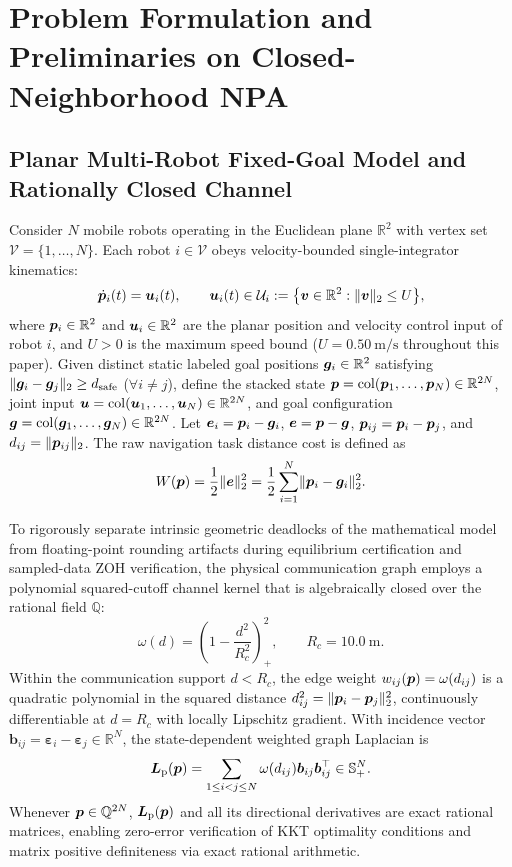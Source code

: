 \section{Problem Formulation and Preliminaries on Closed-Neighborhood NPA}\label{sec:model}

\subsection{Planar Multi-Robot Fixed-Goal Model and Rationally Closed Channel}
Consider $N$ mobile robots operating in the Euclidean plane $\mathbb R^2$ with vertex set $\mathcal V=\{1,\dots,N\}$. Each robot $i\in\mathcal V$ obeys velocity-bounded single-integrator kinematics:
\begin{equation}
 \dot{\boldsymbol{p}}_i(t)=\boldsymbol{u}_i(t),\qquad \boldsymbol{u}_i(t)\in\mathcal U_i:=\big\{\boldsymbol v\in\mathbb R^2:\lVert\boldsymbol v\rVert_2\le U\big\},
 \label{eq:kinematics}
\end{equation}
where $\boldsymbol{p}_i\in\mathbb R^2$ and $\boldsymbol{u}_i\in\mathbb R^2$ are the planar position and velocity control input of robot $i$, and $U>0$ is the maximum speed bound ($U=0.50\ \mathrm{m/s}$ throughout this paper). Given distinct static labeled goal positions $\boldsymbol{g}_i\in\mathbb R^2$ satisfying $\lVert\boldsymbol{g}_i-\boldsymbol{g}_j\rVert_2\ge d_{\mathrm{safe}}$ ($\forall i\ne j$), define the stacked state $\boldsymbol{p}=\operatorname{col}(\boldsymbol{p}_1,\dots,\boldsymbol{p}_N)\in\mathbb R^{2N}$, joint input $\boldsymbol{u}=\operatorname{col}(\boldsymbol{u}_1,\dots,\boldsymbol{u}_N)\in\mathbb R^{2N}$, and goal configuration $\boldsymbol{g}=\operatorname{col}(\boldsymbol{g}_1,\dots,\boldsymbol{g}_N)\in\mathbb R^{2N}$. Let $\boldsymbol{e}_i=\boldsymbol{p}_i-\boldsymbol{g}_i$, $\boldsymbol{e}=\boldsymbol{p}-\boldsymbol{g}$, $\boldsymbol{p}_{ij}=\boldsymbol{p}_i-\boldsymbol{p}_j$, and $d_{ij}=\lVert\boldsymbol{p}_{ij}\rVert_2$. The raw navigation task distance cost is defined as
\begin{equation}
 W(\boldsymbol{p})=\frac12\lVert\boldsymbol{e}\rVert_2^2=\frac12\sum_{i=1}^N\lVert\boldsymbol{p}_i-\boldsymbol{g}_i\rVert_2^2.
 \label{eq:W-def}
\end{equation}

To rigorously separate intrinsic geometric deadlocks of the mathematical model from floating-point rounding artifacts during equilibrium certification and sampled-data ZOH verification, the physical communication graph employs a polynomial squared-cutoff channel kernel that is algebraically closed over the rational field $\mathbb Q$:
\begin{equation}
 \omega(d)=\left(1-\frac{d^2}{R_c^2}\right)_+^2,\qquad R_c=10.0\ \mathrm m.
 \label{eq:poly-channel}
\end{equation}
Within the communication support $d<R_c$, the edge weight $w_{ij}(\boldsymbol{p})=\omega(d_{ij})$ is a quadratic polynomial in the squared distance $d_{ij}^2=\lVert\boldsymbol{p}_i-\boldsymbol{p}_j\rVert_2^2$, continuously differentiable at $d=R_c$ with locally Lipschitz gradient. With incidence vector $\boldsymbol b_{ij}=\boldsymbol\varepsilon_i-\boldsymbol\varepsilon_j\in\mathbb R^N$, the state-dependent weighted graph Laplacian is
\begin{equation}
 \boldsymbol{L}_{\mathrm{p}}(\boldsymbol{p})=\sum_{1\le i<j\le N}\omega(d_{ij})\boldsymbol b_{ij}\boldsymbol b_{ij}^{\top}\in\mathbb S_+^N.
 \label{eq:laplacian}
\end{equation}
Whenever $\boldsymbol{p}\in\mathbb Q^{2N}$, $\boldsymbol{L}_{\mathrm{p}}(\boldsymbol{p})$ and all its directional derivatives are exact rational matrices, enabling zero-error verification of KKT optimality conditions and matrix positive definiteness via exact rational arithmetic.

